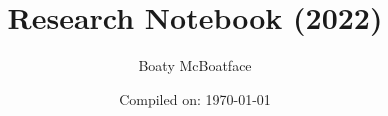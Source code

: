 \documentclass[openany,onecolumn,oneside]{memoir}
\begin{document}

\title{Research Notebook (2022)}
\author{Boaty McBoatface}
\date{Compiled on: \today }
\maketitle
\clearpage



\begin{KeepFromToc}
    \tableofcontents
\end{KeepFromToc}

\newpage
\newpage
{}


%

%
%
%
%
%
%
%
%
%





\appendixpage
\label{appendixpage}
 
%
\onecolumn




{}





\renewcommand*{\bibfont}{\footnotesize}

%
%

\printbibliography{}
\end{document}

